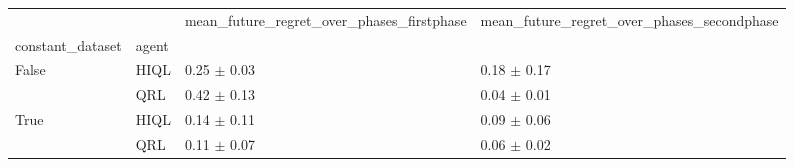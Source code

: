 \begin{tabular}{llll}
\toprule
 &  & mean_future_regret_over_phases_firstphase & mean_future_regret_over_phases_secondphase \\
constant_dataset & agent &  &  \\
\midrule
\multirow[t]{2}{*}{False} & HIQL & 0.25 $\pm$ 0.03 & 0.18 $\pm$ 0.17 \\
 & QRL & 0.42 $\pm$ 0.13 & 0.04 $\pm$ 0.01 \\
\cline{1-4}
\multirow[t]{2}{*}{True} & HIQL & 0.14 $\pm$ 0.11 & 0.09 $\pm$ 0.06 \\
 & QRL & 0.11 $\pm$ 0.07 & 0.06 $\pm$ 0.02 \\
\cline{1-4}
\bottomrule
\end{tabular}
